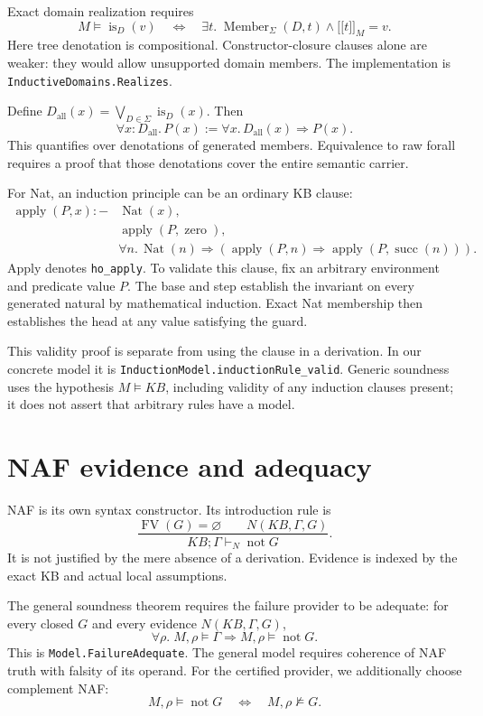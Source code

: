 \documentclass[11pt]{article}
\newcommand{\KB}{\mathit{KB}}
\newcommand{\Dall}{D_{\mathrm{all}}}
\newcommand{\naf}{\mathop{\mathrm{not}}}
\begin{document}
Exact domain realization requires
\[
 M\models\operatorname{is}_D(v)
 \quad\Longleftrightarrow\quad
 \exists t.\;\operatorname{Member}_\Sigma(D,t)\land\lbrack\!\lbrack t\rbrack\!\rbrack_M=v.
\]
Here tree denotation is compositional. Constructor-closure clauses alone are
weaker: they would allow unsupported domain members. The implementation is
\texttt{InductiveDomains.Realizes}.

Define $\Dall(x)=\bigvee_{D\in\Sigma}\operatorname{is}_D(x)$. Then
\[
 \forall x:\Dall.\,P(x):=\forall x.\,\Dall(x)\Rightarrow P(x).
\]
This quantifies over denotations of generated members. Equivalence to raw forall
requires a proof that those denotations cover the entire semantic carrier.

For Nat, an induction principle can be an ordinary KB clause:
\[
\begin{split}
 \operatorname{apply}(P,x)\mathbin{:-}{}&\operatorname{Nat}(x),\\
 &\operatorname{apply}(P,\operatorname{zero}),\\
 &\forall n.\,\operatorname{Nat}(n)\Rightarrow
   (\operatorname{apply}(P,n)\Rightarrow
    \operatorname{apply}(P,\operatorname{succ}(n))).
\end{split}
\]
Apply denotes \texttt{ho\_apply}. To validate this clause, fix an arbitrary
environment and predicate value $P$. The base and step establish the invariant
on every generated natural by mathematical induction. Exact Nat membership
then establishes the head at any value satisfying the guard.

This validity proof is separate from using the clause in a derivation. In our
concrete model it is \texttt{InductionModel.inductionRule\_valid}. Generic
soundness uses the hypothesis $M\models\KB$, including validity of any induction
clauses present; it does not assert that arbitrary rules have a model.

\section{NAF evidence and adequacy}
NAF is its own syntax constructor. Its introduction rule is
\[
 \frac{\operatorname{FV}(G)=\varnothing\qquad N(\KB,\Gamma,G)}
      {\KB;\Gamma\vdash_N\naf G}.
\]
It is not justified by the mere absence of a derivation. Evidence is indexed
by the exact KB and actual local assumptions.

The general soundness theorem requires the failure provider to be adequate:
for every closed $G$ and every evidence $N(\KB,\Gamma,G)$,
\[
 \forall\rho.\;M,\rho\models\Gamma\Rightarrow M,\rho\models\naf G.
\]
This is \texttt{Model.FailureAdequate}. The general model requires coherence of
NAF truth with falsity of its operand. For the certified provider, we additionally
choose complement NAF:
\[
 M,\rho\models\naf G\quad\Longleftrightarrow\quad M,\rho\not\models G.
\]
\end{document}
